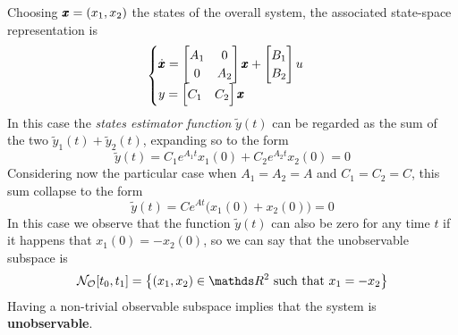 	Choosing $\pmb{x} = (x_1,x_2)$ the states of the overall system, the associated state-space representation is
	\[ \begin{cases}
		\dot{\pmb{x}} = \begin{bmatrix} A_1 & 0 \\ 0 & A_2 \end{bmatrix}\pmb{x} + \begin{bmatrix} B_1 \\B_2  \end{bmatrix} u \\ y = \begin{bmatrix} C_1&C_2 \end{bmatrix} \pmb{x}	\end{cases} \]
	In this case the \textit{states estimator function} $\tilde y(t)$ can be regarded as the sum of the two $\tilde y_1(t) + \tilde y_2(t)$, expanding so to the form
	\[ \tilde y(t) = C_1 e^{A_1t} x_1(0) + C_2 e^{A_2t} x_2(0) = 0 \]
	Considering now the particular case when $A_1 = A_2 = A$ and $C_1 = C_2 = C$, this sum collapse to the form
	\[ \tilde y(t) = C e^{At} \big(x_1(0) + x_2(0)\big) = 0 \]
	In this case we observe that the function $\tilde y(t)$ can also be zero for any time $t$ if it happens that $x_1(0) = - x_2(0)$, so we can say that the unobservable subspace is
	\[ \unobs[t_0,t_1] = \big\{ (x_1,x_2)\in \mathds R^2 \textrm{ such that } x_1 = -x_2 \big\} \]
	Having a non-trivial observable subspace implies that the system is \textbf{unobservable}.
	
